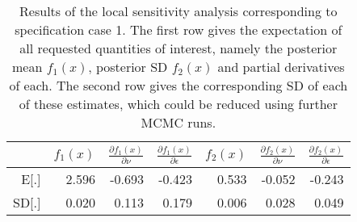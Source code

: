 \begin{table}[ht]
\centering
\begin{tabular}{|r|rrr|rrr|}
  \hline
 &  $f_1(x)$ & $\frac{\partial f_1(x)}{\partial \nu}$ & $\frac{\partial f_1(x)}{\partial \epsilon}$ & $f_2(x)$ & $\frac{\partial f_2(x)}{\partial \nu}$ & $\frac{\partial f_2(x)}{\partial \epsilon}$ \\ 
  \hline
E[.] & 2.596 & -0.693 & -0.423 & 0.533 & -0.052 & -0.243 \\ 
  SD[.] & 0.020 & 0.113 & 0.179 & 0.006 & 0.028 & 0.049 \\ 
   \hline
\end{tabular}
\caption{\footnotesize{Results of the local sensitivity analysis corresponding to specification case 1. The first row gives the expectation of all requested quantities of interest, namely the posterior mean $f_1(x)$, posterior SD $f_2(x)$ and partial derivatives of each. The second row gives the  corresponding SD of each of these estimates, which could be reduced using further MCMC runs.}} 
\label{tab_case1}
\end{table}
